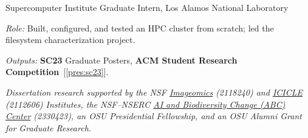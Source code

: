 {%
{Supercomputer Institute Graduate Intern, Los Alamos National Laboratory}%
\begin{pbullets}
  \item \textit{Role:} Built, configured, and tested an HPC cluster from scratch; led the filesystem characterization project.
  \item \textit{Outputs:} \textbf{SC23} Graduate Posters, \textbf{ACM Student Research Competition}~[\ref{pres:sc23}].
\end{pbullets}
\vspace{4pt}

\noindent\textit{Dissertation research supported by the NSF \href{https://imageomics.osu.edu/}{Imageomics} (2118240) and \href{https://icicle.osu.edu/}{ICICLE} (2112606) Institutes, the NSF--NSERC \href{https://www.biodiversityai.org/}{AI and Biodiversity Change (ABC) Center} (2330423), an OSU Presidential Fellowship, and an OSU Alumni Grant for Graduate Research.}}\par


